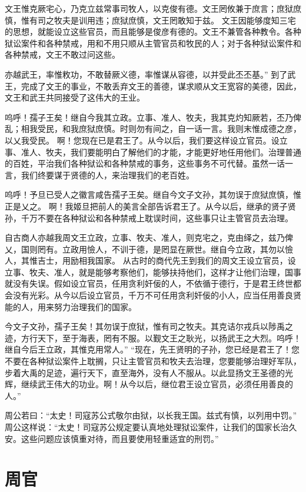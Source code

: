 \documentclass[a4paper,12pt,UTF8,twoside]{ctexbook}
\begin{document}
文王惟克厥宅心，乃克立兹常事司牧人，以克俊有德。文王罔攸兼于庶言；庶狱庶慎，惟有司之牧夫是训用违；庶狱庶慎，文王罔敢知于兹。
文王因能够度知三宅的思想，就能设立这些官员，而且能够是俊彦有德的。文王不兼管各种教令。各种狱讼案件和各种禁戒，用和不用只顺从主管官员和牧民的人；对于各种狱讼案件和各种禁戒，文王不敢过问这些。

亦越武王，率惟敉功，不敢替厥义德，率惟谋从容德，以并受此丕丕基。”
到了武王，完成了文王的事业，不敢丢弃文王的善德，谋求顺从文王宽容的美德，因此，文王和武王共同接受了这伟大的王业。

呜呼！孺子王矣！继自今我其立政。立事、准人、牧夫，我其克灼知厥若，丕乃俾乱；相我受民，和我庶狱庶慎。时则勿有间之，自一话一言。我则末惟成德之彦，以乂我受民。
啊！您现在已是君王了。从今以后，我们要这样设立官员。设立事、准人、牧夫，我们要能明白了解他们的才能，才能更好地任用他们。治理普通的百姓，平治我们各种狱讼和各种禁戒的事务，这些事务不可代替。虽然一话一言，我们终要谋于贤德的人，来治理我们的老百姓。

呜呼！予旦已受人之徽言咸告孺子王矣。继自今文子文孙，其勿误于庶狱庶慎，惟正是乂之。
啊！我姬旦把前人的美言全部告诉君王了。从今以后，继承的贤子贤孙，千万不要在各种狱讼和各种禁戒上耽误时间，这些事只让主管官员去治理。

自古商人亦越我周文王立政，立事、牧夫、准人，则克宅之，克由绎之，兹乃俾乂，国则罔有。立政用憸人，不训于德，是罔显在厥世。继自今立政，其勿以憸人，其惟吉士，用励相我国家。
从古时的商代先王到我们的周文王设立官员，设立事、牧夫、准人，就是能够考察他们，能够扶持他们，这样才让他们治理，国事就没有失误。假如设立官员，任用贪利奸佞的人，不依循于德行，于是君王终世都会没有光彩。从今以后设立官员，千万不可任用贪利奸佞的小人，应当任用善良贤能的人，用来努力治理我们的国家。

今文子文孙，孺子王矣！其勿误于庶狱，惟有司之牧夫。其克诘尔戎兵以陟禹之迹，方行天下，至于海表，罔有不服。以觐文王之耿光，以扬武王之大烈。呜呼！继自今后王立政，其惟克用常人。”
“现在，先王贤明的子孙，您已经是君王了！您不要在各种狱讼案件上耽搁，只让主管官员和牧夫去治理，您要能够治理好军队，步着大禹的足迹，遍行天下，直至海外，没有人不服从。以此显扬文王圣德的光辉，继续武王伟大的功业。啊！从今以后，继位君王设立官员，必须任用善良的人。”

周公若曰：“太史！司寇苏公式敬尔由狱，以长我王国。兹式有慎，以列用中罚。”
周公这样说：“太史！司寇苏公规定要认真地处理狱讼案件，让我们的国家长治久安。这些问题应该慎重对待，而且要使用轻重适宜的刑罚。”

\chapter{周官}
\end{document}
